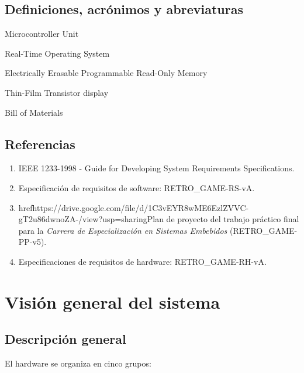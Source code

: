 \documentclass[11pt,a4paper]{article}
\begin{document}
\subsection{Definiciones, acrónimos y abreviaturas}
\begin{description}[labelwidth=2cm,labelindent=0.6cm]
  \item[MCU] Microcontroller Unit
  \item[RTOS] Real-Time Operating System
  \item[EEPROM] Electrically Erasable Programmable Read-Only Memory
  \item[TFT] Thin-Film Transistor display
  \item[BOM] Bill of Materials
\end{description}

\subsection{Referencias}
\begin{enumerate}
  \item IEEE 1233-1998 - Guide for Developing System Requirements Specifications.
  \item Especificación de requisitos de software: RETRO\_GAME-RS-vA.
  \item href{https://drive.google.com/file/d/1C3vEYR8wME6EzlZVVC-gT2u86dwnoZA-/view?usp=sharing}{Plan de proyecto del trabajo práctico final} para la \textit{Carrera de Especialización en Sistemas Embebidos} (RETRO\_GAME-PP-v5). 
  \item Especificaciones de requisitos de hardware: RETRO\_GAME-RH-vA.
\end{enumerate}

\section{Visión general del sistema}

\subsection{Descripción general}
El hardware se organiza en cinco grupos:
\end{document}
